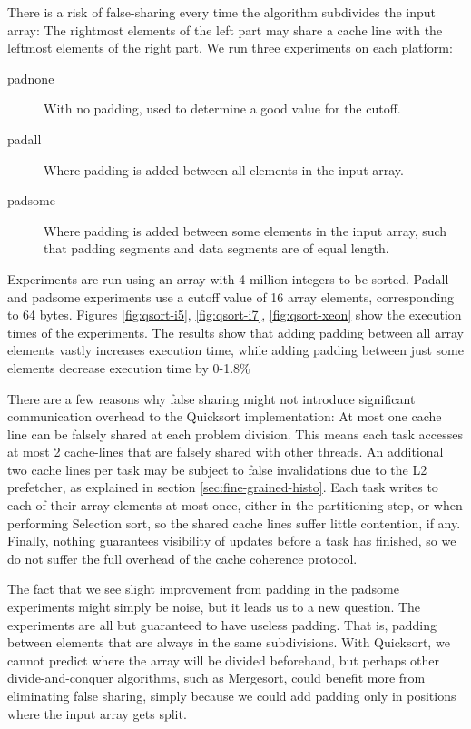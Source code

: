 There is a risk of false-sharing every time the algorithm subdivides the input
array: The rightmost elements of the left part may share a cache line with the
leftmost elements of the right part. We run three experiments on each platform:
\begin{description}
	\item[padnone] With no padding, used to determine a good value for the cutoff.
	\item[padall] Where padding is added between all elements in the input
		array.
	\item[padsome] Where padding is added between some elements in the input
		array, such that padding segments and data segments are of equal
		length.
\end{description}

Experiments are run using an array with 4 million integers to be sorted. Padall
and padsome experiments use a cutoff value of 16 array elements, corresponding
to 64 bytes. Figures \ref{fig:qsort-i5}, \ref{fig:qsort-i7},
\ref{fig:qsort-xeon} show the execution times of the experiments. The results
show that adding padding between all array elements vastly increases execution
time, while adding padding between just some elements decrease execution time by
0-1.8\%

There are a few reasons why false sharing might not introduce significant
communication overhead to the Quicksort implementation: At most one cache line 
can be falsely shared at each problem division. This means each task
accesses at most 2 cache-lines that are falsely shared with other threads. An
additional two cache lines per task may be subject
to false invalidations due to the L2 prefetcher, as explained in
section \ref{sec:fine-grained-histo}. Each task writes to each of their array
elements at most once, either in the partitioning step, or when performing
Selection sort, so the shared cache lines suffer little contention, if any.
Finally, nothing guarantees visibility of updates before a task has finished, so
we do not suffer the full overhead of the cache coherence protocol.

The fact that we see slight improvement from padding in the padsome experiments
might simply be noise, but it leads us to a new question. The experiments are
all but guaranteed to have useless padding. That is, padding between elements
that are always in the same subdivisions. With Quicksort, we cannot predict
where the array will be divided beforehand, but perhaps other divide-and-conquer
algorithms, such as Mergesort, could benefit more from eliminating false
sharing, simply because we could add padding only in positions where the input
array gets split.

